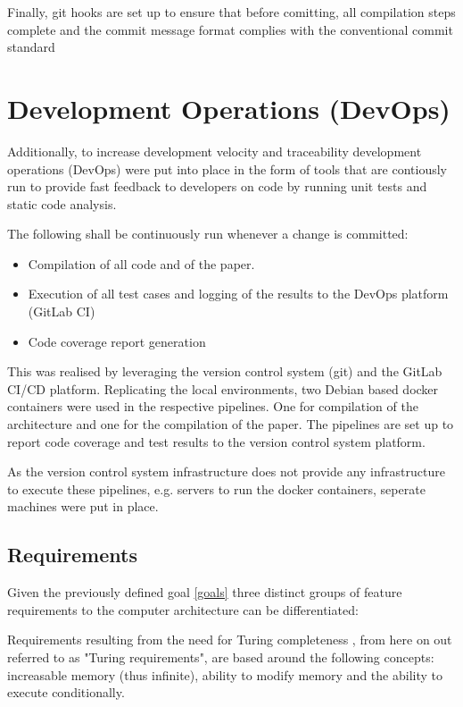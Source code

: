 Finally, git hooks are set up to ensure that before comitting, all compilation steps complete and the commit message format complies with the conventional commit standard \cite{conventionalcommit}

\section{Development Operations (DevOps)}
Additionally, to increase development velocity and traceability development operations (DevOps) were put into place in the form of tools that are contiously run to provide fast feedback to developers on code by running unit tests and static code analysis. 

The following shall be continuously run whenever a change is committed:

\begin{itemize}
  \item Compilation of all code and of the paper.  
  \item Execution of all test cases and logging of the results to the DevOps platform (GitLab CI)
  \item Code coverage report generation
\end{itemize}

This was realised by leveraging the version control system (git) and the GitLab CI/CD platform. Replicating the local environments, two Debian based docker containers \cite{dockerVerilator} \cite{dockerLatex} were used in the respective pipelines. One for compilation of the architecture and one for the compilation of the paper. The pipelines are set up to report code coverage and test results to the version control system platform. 

As the version control system infrastructure does not provide any infrastructure to execute these pipelines, e.g. servers to run the docker containers, seperate machines were put in place.

\subsection{Requirements}
Given the previously defined goal \ref{goals} three distinct groups of feature requirements to the computer architecture can be differentiated: 

Requirements resulting from the need for Turing completeness \cite{turing1936a}, from here on out referred to as "Turing requirements", are based around the following concepts: increasable memory (thus infinite), ability to modify memory and the ability to execute conditionally. 

